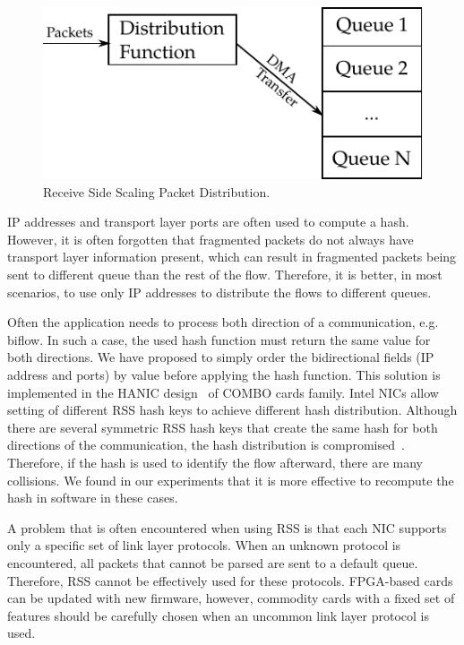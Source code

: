 \begin{figure}[t!]
  \begin{center}
    \includegraphics{figures/c05/rss}
  \end{center}
  \caption{Receive Side Scaling Packet Distribution.}
  \label{fig:rss}
\end{figure}

IP addresses and transport layer ports are often used to compute a hash. However, it is often forgotten that fragmented packets do not always have transport layer information present, which can result in fragmented packets being sent to different queue than the rest of the flow. Therefore, it is better, in most scenarios, to use only IP addresses to distribute the flows to different queues.

Often the application needs to process both direction of a communication, e.g. biflow. In such a case, the used hash function must return the same value for both directions. We have proposed to simply order the bidirectional fields (IP address and ports) by value before applying the hash function. This solution is implemented in the HANIC design~\cite{Liberouter--Hanic} of COMBO cards family. Intel NICs allow setting of different RSS hash keys to achieve different hash distribution. Although there are several symmetric RSS hash keys that create the same hash for both directions of the communication, the hash distribution is compromised~\cite{Woo-2012-Scalable}. Therefore, if the hash is used to identify the flow afterward, there are many collisions. We found in our experiments that it is more effective to recompute the hash in software in these cases.

A problem that is often encountered when using RSS is that each NIC supports only a specific set of link layer protocols. When an unknown protocol is encountered, all packets that cannot be parsed are sent to a default queue. Therefore, RSS cannot be effectively used for these protocols. FPGA-based cards can be updated with new firmware, however, commodity cards with a fixed set of features should be carefully chosen when an uncommon link layer protocol is used.

